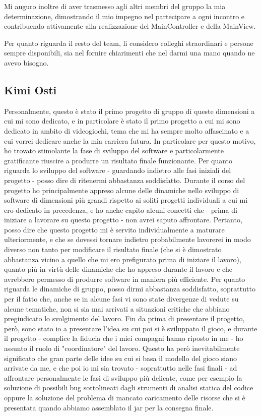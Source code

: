 \documentclass[a4paper,12pt]{report}
\begin{document}
Mi auguro inoltre di aver trasmesso agli altri membri del gruppo la mia determinazione, dimostrando il mio impegno nel partecipare a ogni incontro e contribuendo attivamente alla realizzazione del MainController e della MainView.

Per quanto riguarda il resto del team, li considero colleghi straordinari e persone sempre disponibili, sia nel fornire chiarimenti che nel darmi una mano quando ne avevo bisogno.

\subsection{Kimi Osti}
Personalmente, questo è stato il primo progetto di gruppo di queste dimensioni a cui mi sono dedicato, e in particolare è stato il primo progetto a cui mi sono dedicato in ambito di videogiochi, tema che mi ha sempre molto affascinato e a cui vorrei dedicare anche la mia carriera futura. In particolare per questo motivo, ho trovato stimolante la fase di sviluppo del software e particolarmente gratificante riuscire a produrre un risultato finale funzionante.
\newline Per quanto riguarda lo sviluppo del software - guardando indietro alle fasi iniziali del progetto - posso dire di ritenermi abbastanza soddisfatto. Durante il corso del progetto ho principalmente appreso alcune delle dinamiche nello sviluppo di software di dimensioni più grandi rispetto ai soliti progetti individuali a cui mi ero dedicato in precedenza, e ho anche capito alcuni concetti che - prima di iniziare a lavorare su questo progetto - non avrei saputo affrontare. Pertanto, posso dire che questo progetto mi è servito individualmente a maturare ulteriormente, e che se dovessi tornare indietro probabilmente lavorerei in modo diverso non tanto per modificare il risultato finale (che si è dimostrato abbastanza vicino a quello che mi ero prefigurato prima di iniziare il lavoro), quanto più in virtù delle dinamiche che ho appreso durante il lavoro e che avrebbero permesso di produrre software in maniera più efficiente.
\newline Per quanto riguarda le dinamiche di gruppo, posso dirmi abbastanza soddisfatto, soprattutto per il fatto che, anche se in alcune fasi vi sono state divergenze di vedute su alcune tematiche, non si sia mai arrivati a situazioni critiche che abbiano pregiudicato lo svolgimento del lavoro. Fin da prima di presentare il progetto, però, sono stato io a presentare l'idea su cui poi si è sviluppato il gioco, e durante il progetto - complice la fiducia che i miei compagni hanno riposto in me - ho assunto il ruolo di "coordinatore" del lavoro. Questo ha però inevitabilmente significato che gran parte delle idee su cui si basa il modello del gioco siano arrivate da me, e che poi io mi sia trovato - soprattutto nelle fasi finali - ad affrontare personalmente le fasi di sviluppo più delicate, come per esempio la soluzione di possibili bug sottolineati dagli strumenti di analisi statica del codice oppure la soluzione del problema di mancato caricamento delle risorse che si è presentata quando abbiamo assemblato il jar per la consegna finale.
\end{document}
